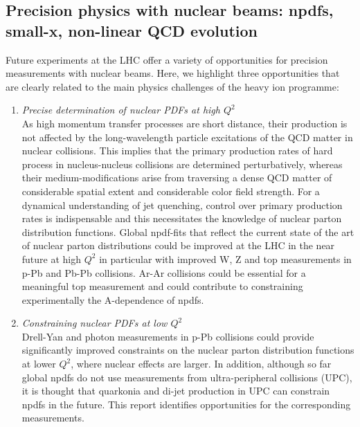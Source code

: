 \documentclass[../report.tex]{subfiles}
\begin{document}
\subsection{Precision physics with nuclear beams: npdfs, small-x, non-linear QCD evolution}
Future experiments at the LHC offer a variety of opportunities for precision measurements with nuclear beams. Here, we highlight three opportunities that are clearly related to the main physics challenges of the heavy ion programme:

\begin{enumerate}
\item {\it Precise determination of nuclear PDFs at high $Q^2$}\\ As high momentum transfer processes are short distance, their production is not affected by the long-wavelength particle excitations of the QCD matter in nuclear collisions. This implies that the primary production rates of hard process in nucleus-nucleus collisions are determined perturbatively, whereas their medium-modifications arise from traversing a dense QCD matter of considerable spatial extent and considerable color field strength. For  a dynamical understanding of jet quenching, control over primary production rates is indispensable and this necessitates the knowledge of nuclear parton distribution functions. Global npdf-fits that reflect the current state of the art of nuclear parton distributions could be improved at the LHC in the near future at high $Q^2$ in particular with improved W, Z and top measurements in p-Pb and Pb-Pb collisions. Ar-Ar collisions could be essential for a meaningful top measurement and could contribute to constraining experimentally the A-dependence of npdfs. 
\item {\it Constraining nuclear PDFs at low $Q^2$}\\ Drell-Yan and photon measurements in p-Pb collisions could provide significantly improved constraints on the nuclear parton distribution functions at lower $Q^2$, where nuclear effects are larger. In addition, although so far global npdfs do not use measurements from ultra-peripheral collisions (UPC), it is thought that quarkonia and di-jet production in UPC can constrain npdfs in the future. This report identifies opportunities for the corresponding measurements. 

\end{enumerate}
\end{document}

